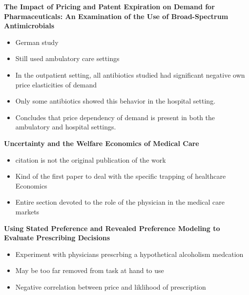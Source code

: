 \noindent\textbf{The Impact of Pricing and Patent Expiration on Demand for Pharmaceuticals: An Examination of the Use of Broad-Spectrum Antimicrobials} \cite{kaier_impact_2013}\\
\begin{itemize}
    \item German study
    \item Still used ambulatory care settings
    \item In the outpatient setting, all antibiotics studied had significant negative own price elasticities of demand
    \item Only some antibiotics showed this behavior in the hospital setting.
    \item Concludes that price dependency of demand is present in both the ambulatory and hospital settings.
\end{itemize}

\noindent\textbf{Uncertainty and the Welfare Economics of Medical Care} \cite{arrow_uncertainty_2004}\\
\begin{itemize}
    \item citation is not the original publication of the work
    \item Kind of the first paper to deal with the specific trapping of healthcare Economics
    \item Entire section devoted to the role of the physician in the medical care markets
\end{itemize}

\noindent\textbf{Using Stated Preference and Revealed Preference Modeling to Evaluate Prescribing Decisions} \cite{mark_using_2004}\\
\begin{itemize}
    \item Experiment with physicians prescrbing a hypothetical alcoholism medcation
    \item May be too far removed from task at hand to use
    \item Negative correlation between price and liklihood of prescription
\end{itemize}


\newpage

 



